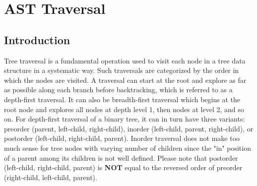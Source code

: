
\chapter{AST Traversal}
\label{AstProcessing:astProcessing}


\section{Introduction}
\label{AstProcessing:introduction}
Tree traversal is a fundamental operation used to visit each node in a tree
data structure in a systematic way. Such traversals are categorized by the
order in which the nodes are visited. A traversal can start at the root and
explore as far as possible along each branch before backtracking, which is
referred to as a depth-first traversal. It can also be breadth-first
traversal which begins at the root node
and explores all nodes at depth level 1, then nodes at level 2, and so on. 
For depth-first traversal of a binary tree, it can in turn have three
variants: preorder (parent, left-child, right-child), inorder (left-child,
parent, right-child), or postorder (left-child, right-child, parent).
Inorder traversal does not make too much sense for tree nodes with varying
number of children since the "in" position of a parent among its children
is not well defined.  
Please note that postorder (left-child, right-child, parent) is
\textbf{NOT} equal to the reversed order of preorder (right-child, left-child, parent).  

